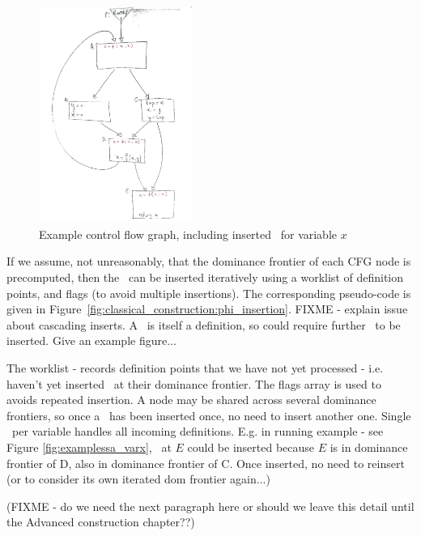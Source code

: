 \begin{figure}
\includegraphics[width=5cm]{ssa_variablex.jpg}
\caption{\label{fig:examplecfg}Example control flow graph, including
inserted \phiops\ for variable $x$
}
\end{figure}



If we assume, not unreasonably, that the dominance frontier of each
CFG node is precomputed, then the \phiops\ can be inserted iteratively
using a worklist of definition points, and flags (to avoid multiple
insertions). The corresponding pseudo-code is given in
Figure~\ref{fig:classical_construction:phi_insertion}.
FIXME - explain issue about cascading inserts. A \phiop\ is itself a 
definition, so could require further \phiops\ to be inserted.
Give an example figure...

The worklist - records definition points that we have not yet
processed - i.e. haven't yet inserted \phiops\ at their dominance
frontier.
The flags array is used to avoids repeated insertion. A node may be
shared across several dominance frontiers, so once a \phiop\ has been
inserted once, no need to insert another one. Single \phiop\ per
variable handles all incoming definitions.
E.g. in running example - see Figure \ref{fig:examplessa_varx},
\phiop\ at $E$ could be inserted because $E$
is in dominance frontier of D, also in dominance frontier of C. Once
inserted, no need to reinsert (or to consider its own iterated dom
frontier again...)


(FIXME - do we need the next paragraph here or should we leave this detail until
the Advanced construction chapter??)

